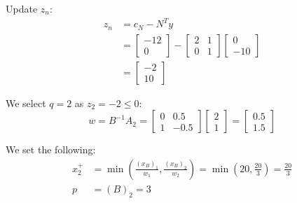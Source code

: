 \documentclass[12pt]{article}
\begin{document}
Update $z_n$:
\begin{align*}
z_n &= c_N - N^Ty \\
&= \left[\begin{array}{c} -12 \\ 0 \end{array}\right] - \left[\begin{array}{cc} 2 & 1 \\ 0 & 1 \end{array}\right]\left[\begin{array}{c} 0 \\ -10 \end{array}\right] \\
&= \left[\begin{array}{c} -2 \\ 10 \end{array}\right]
\end{align*}

We select $q=2$ as $z_2 = -2 \le 0$:
$$
w = B^{-1}A_2 = \left[\begin{array}{cc} 0 & 0.5 \\ 1 & -0.5 \end{array}\right]\left[\begin{array}{c} 2 \\ 1 \end{array}\right] =
\left[\begin{array}{c} 0.5 \\ 1.5 \end{array}\right]
$$

We set the following:
\begin{align*}
x_2^+ &= \min\left(\frac{(x_B)_1}{w_1}, \frac{(x_B)_2}{w_2}\right) = \min\left(20, \frac{20}{3} \right) = \frac{20}{3} \\
p &= (B)_2 = 3
\end{align*}
\end{document}
